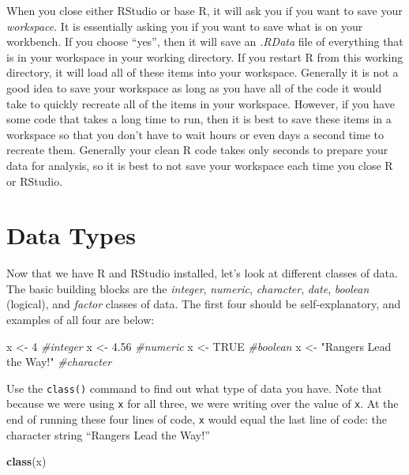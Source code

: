 \documentclass[]{book}
\newenvironment{Shaded}{\begin{snugshade}}{\end{snugshade}}
\newcommand{\KeywordTok}[1]{\textcolor[rgb]{0.13,0.29,0.53}{\textbf{{#1}}}}
\newcommand{\DecValTok}[1]{\textcolor[rgb]{0.00,0.00,0.81}{{#1}}}
\newcommand{\FloatTok}[1]{\textcolor[rgb]{0.00,0.00,0.81}{{#1}}}
\newcommand{\StringTok}[1]{\textcolor[rgb]{0.31,0.60,0.02}{{#1}}}
\newcommand{\CommentTok}[1]{\textcolor[rgb]{0.56,0.35,0.01}{\textit{{#1}}}}
\newcommand{\OtherTok}[1]{\textcolor[rgb]{0.56,0.35,0.01}{{#1}}}
\newcommand{\NormalTok}[1]{{#1}}
\begin{document}
When you close either RStudio or base R, it will ask you if you want to
save your \emph{workspace}. It is essentially asking you if you want to
save what is on your workbench. If you choose ``yes'', then it will save
an \emph{.RData} file of everything that is in your workspace in your
working directory. If you restart R from this working directory, it will
load all of these items into your workspace. Generally it is not a good
idea to save your workspace as long as you have all of the code it would
take to quickly recreate all of the items in your workspace. However, if
you have some code that takes a long time to run, then it is best to
save these items in a workspace so that you don't have to wait hours or
even days a second time to recreate them. Generally your clean R code
takes only seconds to prepare your data for analysis, so it is best to
not save your workspace each time you close R or RStudio.

\section{Data Types}\label{data-types}

Now that we have R and RStudio installed, let's look at different
classes of data. The basic building blocks are the \emph{integer},
\emph{numeric}, \emph{character}, \emph{date}, \emph{boolean} (logical),
and \emph{factor} classes of data. The first four should be
self-explanatory, and examples of all four are below:

\begin{Shaded}
\begin{Highlighting}[]
\NormalTok{x <-}\StringTok{ }\DecValTok{4}                        \CommentTok{#integer}
\NormalTok{x <-}\StringTok{ }\FloatTok{4.56}                     \CommentTok{#numeric}
\NormalTok{x <-}\StringTok{ }\OtherTok{TRUE}                     \CommentTok{#boolean}
\NormalTok{x <-}\StringTok{ "Rangers Lead the Way!"}  \CommentTok{#character}
\end{Highlighting}
\end{Shaded}

Use the \texttt{class()} command to find out what type of data you have.
Note that because we were using \texttt{x} for all three, we were
writing over the value of \texttt{x}. At the end of running these four
lines of code, \texttt{x} would equal the last line of code: the
character string ``Rangers Lead the Way!''

\begin{Shaded}
\begin{Highlighting}[]
\KeywordTok{class}\NormalTok{(x)}
\end{Highlighting}
\end{Shaded}
\end{document}
